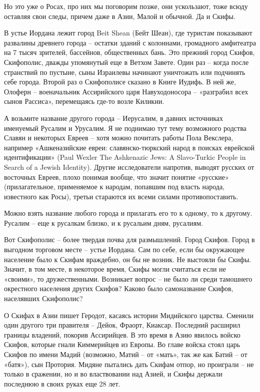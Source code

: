 Но это уже о Росах, про них мы поговорим позже, они ускользают, тоже всюду оставляя свои следы, причем даже в Азии, Малой и обычной. Да и Скифы.

В устье Иордана лежит город Beit Shean (Бейт Шеан), где туристам показывают развалины древнего города – остатки зданий с колоннами, громадного амфитеатра на 7 тысяч зрителей, бассейнов, общественных бань. Это прежний город Скифов, Скифополис, дважды упомянутый еще в Ветхом Завете. Один раз – когда после странствий по пустыне, сыны Израилевы начинают уничтожать или подчинять себе города. Второй раз о Скифополисе сказано в Книге Иудифь. В ней же, Олоферн – военачальник Ассирийского царя Навуходоносора – «разграбил всех сынов Рассиса», перемещаясь где-то возле Киликии.

А возьмите название другого города – Иерусалим, в давних источниках именуемый Русалим и Урусалим. Я не поднимаю тут тему возможного родства Славян и некоторых Евреев – хотя можно почитать работы Пола Векслера, например «Ашкеназийские евреи: славянско-тюркский народ в поисках еврейской идентификации» (Paul Wexler The Ashkenazic Jews: A Slavo-Turkic People in Search of a Jewish Identity). Другие исследователи напротив, выводят русских от восточных Евреев, плохо понимая вообще, что значит понятие «русские» (прилагательное, применяемое к народам, попавшим под власть народа, известного как Росы), третьи стараются их всеми силами противопоставить.

Можно взять название любого города и прилагать его то к одному, то к другому. Русалим – еще к русалкам близко, и к русальим дням, русалиям.

Вот Скифополис – более твердая почва для размышлений. Город Скифов. Город в выгодном торговом месте – устье Иордана. Сам по себе, если бы окружающее население было к Скифам враждебно, он бы не возник. Не выстояли бы Скифы. Значит, в том месте, в некоторое время, Скифы могли считаться если не «своими», то дружественными. Возникает вопрос – не было ли среди тамошнего окрестного населения других Скифов? Каково было самоназвание Скифов, населявших Скифополис?

О Скифах в Азии пишет Геродот, касаясь истории Мидийского царства. Сменили один другого три правителя – Дейок, Фраорт, Киаксар. Последний расширил границы владений, покорив Ассирийцев. В это время в Азию явилось войско Скифов, которые гнали Киммерийцев из Европы. Во главе войска стоял царь Скифов по имени Мадий (возможно, Матий – от «мать», так же как Батий – от «батя»), сын Протория. Мидяне пытались дать Скифам отпор, но проиграли – не только в сражении, но и во властвовании над Азией, и Скифы держали последнюю в своих руках еще 28 лет.

